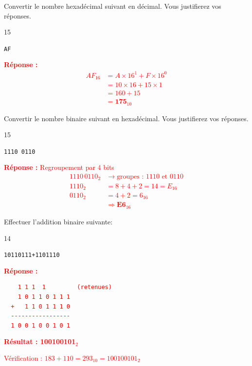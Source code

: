 \documentclass[a4paper,10pt]{report}
\def\ptsexoD{1}
\def\ptsexoE{1}
\def\ptsexoF{1}
\begin{document}
\begin{minipage}{0.49\linewidth}
 \exods{\ptsexoD}

   Convertir le nombre hexadécimal suivant en décimal. Vous justifierez vos réponses.

\begin{answer}{1}{5} 
    \begin{center}
        \verb|AF|
    \end{center}   
\end{answer}

\textcolor{red}{
\textbf{Réponse :}
\begin{align*}
AF_{16} &= A \times 16^1 + F \times 16^0 \\
&= 10 \times 16 + 15 \times 1 \\
&= 160 + 15 \\
&= \textbf{175}_{10}
\end{align*}
}
\end{minipage}\hfill
\begin{minipage}{0.49\linewidth}
     \exods{\ptsexoE}

Convertir le nombre binaire suivant en hexadécimal. Vous justifierez vos réponses.
\begin{answer}{1}{5} 
    \begin{center}
        \verb|1110 0110|
    \end{center}   
\end{answer}

\textcolor{red}{
\textbf{Réponse :} Regroupement par 4 bits
\begin{align*}
1110\,0110_2 &\rightarrow \text{groupes : } 1110 \text{ et } 0110 \\
1110_2 &= 8 + 4 + 2 = 14 = E_{16} \\
0110_2 &= 4 + 2 = 6_{16} \\
&\Rightarrow \textbf{E6}_{16}
\end{align*}
}
\end{minipage}

\medskip

\exods{\ptsexoF}

Effectuer l'addition binaire suivante:



    \begin{answer}{1}{4} \begin{center}
        \verb|10110111+1101110|
\end{center}  \end{answer}

\textcolor{red}{
\textbf{Réponse :}
\begin{verbatim}
    1 1 1  1         (retenues)
    1 0 1 1 0 1 1 1
  +   1 1 0 1 1 1 0
  -----------------
  1 0 0 1 0 0 1 0 1
\end{verbatim}
\textbf{Résultat : 100100101}$_2$

Vérification : $183 + 110 = 293_{10} = 100100101_2$ \checkmark
}
\end{document}

